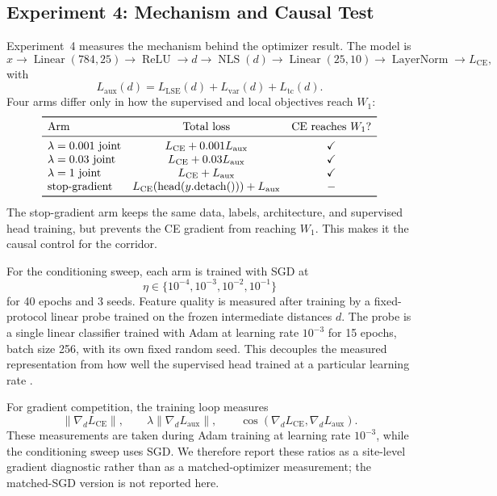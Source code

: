 \subsection{Experiment 4: Mechanism and Causal Test}
Experiment~4 measures the mechanism behind the optimizer result. The model is
\[
    x \rightarrow \operatorname{Linear}(784,25)
    \rightarrow \operatorname{ReLU}
    \rightarrow d
    \rightarrow \operatorname{NLS}(d)
    \rightarrow \operatorname{Linear}(25,10)
    \rightarrow \operatorname{LayerNorm}
    \rightarrow L_{\mathrm{CE}},
\]
with
\[
    L_{\mathrm{aux}}(d)
    =
    L_{\mathrm{LSE}}(d)+L_{\mathrm{var}}(d)+L_{\mathrm{tc}}(d).
\]
Four arms differ only in how the supervised and local objectives reach $W_1$:
\[
\begin{array}{lcc}
\toprule
\text{Arm} & \text{Total loss} & \text{CE reaches } W_1? \\
\midrule
\lambda=0.001 \text{ joint} & L_{\mathrm{CE}}+0.001L_{\mathrm{aux}} & \checkmark \\
\lambda=0.03 \text{ joint} & L_{\mathrm{CE}}+0.03L_{\mathrm{aux}} & \checkmark \\
\lambda=1 \text{ joint} & L_{\mathrm{CE}}+L_{\mathrm{aux}} & \checkmark \\
\text{stop-gradient} & L_{\mathrm{CE}}(\operatorname{head}(y.\mathrm{detach}()))
    +L_{\mathrm{aux}} & - \\
\bottomrule
\end{array}
\]
The stop-gradient arm keeps the same data, labels, architecture, and
supervised head training, but prevents the CE gradient from reaching $W_1$.
This makes it the causal control for the corridor.

For the conditioning sweep, each arm is trained with SGD at
\[
    \eta \in \{10^{-4},10^{-3},10^{-2},10^{-1}\}
\]
for 40 epochs and 3 seeds. Feature quality is measured after training by a
fixed-protocol linear probe trained on the frozen intermediate distances $d$.
The probe is a single linear classifier trained with Adam at learning rate
$10^{-3}$ for 15 epochs, batch size 256, with its own fixed random seed. This
decouples the measured representation from how well the supervised head
trained at a particular learning rate \citep{alain2016understanding}.

For gradient competition, the training loop measures
\[
    \|\nabla_d L_{\mathrm{CE}}\|,
    \qquad
    \lambda\|\nabla_d L_{\mathrm{aux}}\|,
    \qquad
    \cos(\nabla_d L_{\mathrm{CE}},\nabla_d L_{\mathrm{aux}}).
\]
These measurements are taken during Adam training at learning rate $10^{-3}$,
while the conditioning sweep uses SGD. We therefore report these ratios as a
site-level gradient diagnostic rather than as a matched-optimizer measurement;
the matched-SGD version is not reported here.

